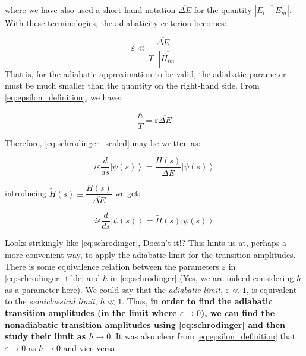 \documentclass[12pt,a4paper]{article}
\begin{document}
	where we have also used a short-hand notation $\overline{\Delta E}$ for the quantity $\left| \overline{E_{l} - E_{m}} \right|$.
	With these terminologies, the adiabaticity criterion becomes:
	
	\begin{equation}
		\varepsilon \ll \dfrac{\overline{\Delta E}}{T \cdot \left| \overline{\dot{H}_{lm}} \right|}
		\label{eq:adiabatic_criterion_epsilon}
	\end{equation}
	That is, for the adiabatic approximation to be valid, the adiabatic parameter must be much smaller than the quantity on the right-hand side.
	From \eqref{eq:epsilon_definition}, we have:
	
	\begin{equation}
		\dfrac{\hbar}{T} = \varepsilon \overline{\Delta E}
		\label{eq:hbar_T}
	\end{equation}
	
	Therefore, \eqref{eq:schrodinger_scaled} may be written as:
	
	\begin{equation}
		i \varepsilon \dfrac{d}{ds} \left| \psi(s) \right\rangle = \dfrac{H(s)}{\overline{\Delta E}} \left| \psi(s) \right\rangle
		\label{eq:schrodinger_epsilon}
	\end{equation}
	
	introducing $\widetilde{H}(s) \equiv \dfrac{H(s)}{\overline{\Delta E}}$ we get:
	
	\begin{equation}
		i \varepsilon \dfrac{d}{ds} \left| \psi(s) \right\rangle = \widetilde{H}(s) \left| \psi(s) \right\rangle
		\label{eq:schrodinger_tilde}
	\end{equation}
	
	Looks strikingly like \eqref{eq:schrodinger}, Doesn't it!? This hints us at, perhaps a more convenient way, to apply the adiabatic limit for the transition amplitudes. There is some equivalence relation between the parameters $\varepsilon$ in \eqref{eq:schrodinger_tilde} and $\hbar$ in \eqref{eq:schrodinger} (Yes, we are indeed considering $\hbar$ as a parameter here). We could say that the \emph{adiabatic limit}, $\varepsilon \ll 1$, is equivalent to the \emph{semiclassical limit}, $\hbar \ll 1$. Thus, \textbf{in order to find the adiabatic transition amplitudes (in the limit where $\varepsilon \rightarrow 0$), we can find the nonadiabatic transition amplitudes using \eqref{eq:schrodinger} and then study their limit as $\hbar \rightarrow 0$}. It was also clear from \eqref{eq:epsilon_definition} that $\varepsilon \rightarrow 0$ as $\hbar \rightarrow 0$ and vice versa.
	
\end{document}
